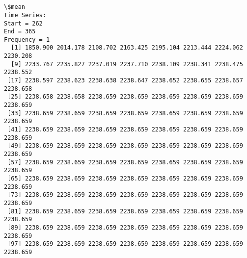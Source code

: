 \documentclass[11pt]{article}
\begin{document}
    \begin{center}
    \end{center}
    { \hspace*{\fill} \\}
    
    \begin{center}
    \end{center}
    { \hspace*{\fill} \\}
    
    \begin{Verbatim}[commandchars=\\\{\}]
\$mean
Time Series:
Start = 262 
End = 365 
Frequency = 1 
  [1] 1850.900 2014.178 2108.702 2163.425 2195.104 2213.444 2224.062 2230.208
  [9] 2233.767 2235.827 2237.019 2237.710 2238.109 2238.341 2238.475 2238.552
 [17] 2238.597 2238.623 2238.638 2238.647 2238.652 2238.655 2238.657 2238.658
 [25] 2238.658 2238.658 2238.659 2238.659 2238.659 2238.659 2238.659 2238.659
 [33] 2238.659 2238.659 2238.659 2238.659 2238.659 2238.659 2238.659 2238.659
 [41] 2238.659 2238.659 2238.659 2238.659 2238.659 2238.659 2238.659 2238.659
 [49] 2238.659 2238.659 2238.659 2238.659 2238.659 2238.659 2238.659 2238.659
 [57] 2238.659 2238.659 2238.659 2238.659 2238.659 2238.659 2238.659 2238.659
 [65] 2238.659 2238.659 2238.659 2238.659 2238.659 2238.659 2238.659 2238.659
 [73] 2238.659 2238.659 2238.659 2238.659 2238.659 2238.659 2238.659 2238.659
 [81] 2238.659 2238.659 2238.659 2238.659 2238.659 2238.659 2238.659 2238.659
 [89] 2238.659 2238.659 2238.659 2238.659 2238.659 2238.659 2238.659 2238.659
 [97] 2238.659 2238.659 2238.659 2238.659 2238.659 2238.659 2238.659 2238.659


\end{Verbatim}
\end{document}
